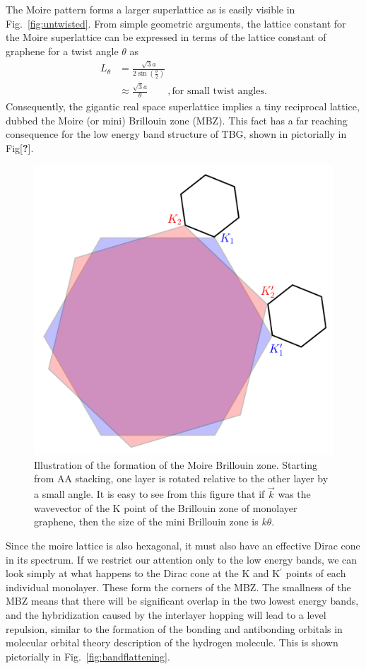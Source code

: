 The Moire pattern forms a larger superlattice as is easily visible in Fig.~\ref{fig:untwisted}. From simple geometric arguments, the lattice constant for the Moire superlattice can be expressed in terms of the lattice constant of graphene for a twist angle $\theta$ as~\cite{Bistritzer2011}
\begin{align}
    L_\theta &= \frac{\sqrt{3}a}{2\sin\left(\frac{\theta}{2}\right)}\, \nonumber  \\
    &\approx \frac{\sqrt{3}a}{\theta} \quad\quad, \text{for small twist angles.}
\end{align}
Consequently, the gigantic real space superlattice implies a tiny reciprocal lattice, dubbed the Moire (or mini) Brillouin zone (MBZ).  
This fact has a far reaching consequence for the low energy band structure of TBG, shown in pictorially in Fig[\textbf{?}]. 
\begin{figure}[!ht]
    \centering
    \includegraphics[width=0.5\linewidth]{figures/introduction/TBGmoire.pdf}  
    \caption{Illustration of the formation of the Moire Brillouin zone. Starting from AA stacking, one layer is rotated relative to the other layer by a small angle. It is easy to see from this figure that if $\vec{k}$ was the wavevector of the K point of the Brillouin zone of monolayer graphene, then the size of the mini Brillouin zone is $k\theta$.}
    \label{fig:moirebrilluoinzone}
\end{figure}
\par
Since the moire lattice is also hexagonal, it must also have an effective Dirac cone in its spectrum. 
If we restrict our attention only to the low energy bands, we can look simply at what happens to the Dirac cone at the K and K${}^\prime$ points of each individual monolayer. These form the corners of the MBZ. The smallness of the MBZ means that there will be significant overlap in the two lowest energy bands, and the hybridization caused by the interlayer hopping will lead to a level repulsion, similar to the formation of the bonding and antibonding orbitals in molecular orbital theory description of the hydrogen molecule. This is shown pictorially in Fig.~\ref{fig:bandflattening}.

